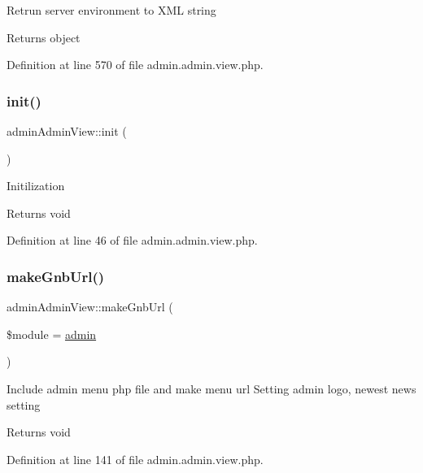 Retrun server environment to X\+ML string \begin{DoxyReturn}{Returns}
object 
\end{DoxyReturn}


Definition at line 570 of file admin.\+admin.\+view.\+php.

\mbox{\label{classadminAdminView_a9211d29a895ebead46f78e6fc9eab285}} 
\subsubsection{\texorpdfstring{init()}{init()}}
{\footnotesize\ttfamily admin\+Admin\+View\+::init (\begin{DoxyParamCaption}{ }\end{DoxyParamCaption})}

Initilization \begin{DoxyReturn}{Returns}
void 
\end{DoxyReturn}


Definition at line 46 of file admin.\+admin.\+view.\+php.

\mbox{\label{classadminAdminView_a6f715be781a41d811166af0ae66b3b93}} 
\subsubsection{\texorpdfstring{make\+Gnb\+Url()}{makeGnbUrl()}}
{\footnotesize\ttfamily admin\+Admin\+View\+::make\+Gnb\+Url (\begin{DoxyParamCaption}\item[{}]{\$module = {\ttfamily \textquotesingle{}\hyperlink{classadmin}{admin}\textquotesingle{}} }\end{DoxyParamCaption})}

Include admin menu php file and make menu url Setting admin logo, newest news setting \begin{DoxyReturn}{Returns}
void 
\end{DoxyReturn}


Definition at line 141 of file admin.\+admin.\+view.\+php.

\mbox{\label{classadminAdminView_a4c4c900f637d618a7c8fbcbf523ad801}} 
